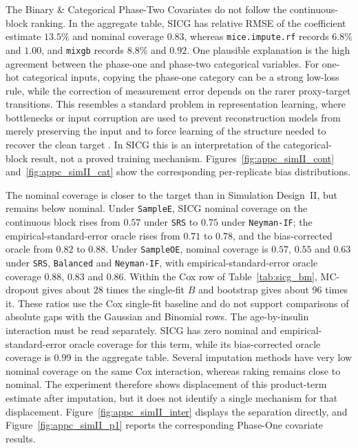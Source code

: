 The Binary \& Categorical Phase-Two Covariates do not follow the continuous-block ranking. In the aggregate table, SICG has relative RMSE of the coefficient estimate $13.5\%$ and nominal coverage $0.83$, whereas \texttt{mice.impute.rf} records $6.8\%$ and $1.00$, and \texttt{mixgb} records $8.8\%$ and $0.92$. One plausible explanation is the high agreement between the phase-one and phase-two categorical variables. For one-hot categorical inputs, copying the phase-one category can be a strong low-loss rule, while the correction of measurement error depends on the rarer proxy-target transitions. This resembles a standard problem in representation learning, where bottlenecks or input corruption are used to prevent reconstruction models from merely preserving the input and to force learning of the structure needed to recover the clean target \citep{vincent2008extracting, bengio2013representation, alain2014regularized}. In SICG this is an interpretation of the categorical-block result, not a proved training mechanism. Figures~\ref{fig:appc_simII_cont} and~\ref{fig:appc_simII_cat} show the corresponding per-replicate bias distributions.

The nominal coverage is closer to the target than in Simulation Design~II, but remains below nominal. Under \texttt{SampleE}, SICG nominal coverage on the continuous block rises from $0.57$ under \texttt{SRS} to $0.75$ under \texttt{Neyman-IF}; the empirical-standard-error oracle rises from $0.71$ to $0.78$, and the bias-corrected oracle from $0.82$ to $0.88$. Under \texttt{SampleOE}, nominal coverage is $0.57$, $0.55$ and $0.63$ under \texttt{SRS}, \texttt{Balanced} and \texttt{Neyman-IF}, with empirical-standard-error oracle coverage $0.88$, $0.83$ and $0.86$. Within the Cox row of Table~\ref{tab:sicg_bm}, MC-dropout gives about $28$ times the single-fit $B$ and bootstrap gives about $96$ times it. These ratios use the Cox single-fit baseline and do not support comparisons of absolute gaps with the Gaussian and Binomial rows. The age-by-insulin interaction must be read separately. SICG has zero nominal and empirical-standard-error oracle coverage for this term, while its bias-corrected oracle coverage is $0.99$ in the aggregate table. Several imputation methods have very low nominal coverage on the same Cox interaction, whereas raking remains close to nominal. The experiment therefore shows displacement of this product-term estimate after imputation, but it does not identify a single mechanism for that displacement. Figure~\ref{fig:appc_simII_inter} displays the separation directly, and Figure~\ref{fig:appc_simII_p1} reports the corresponding Phase-One covariate results.

